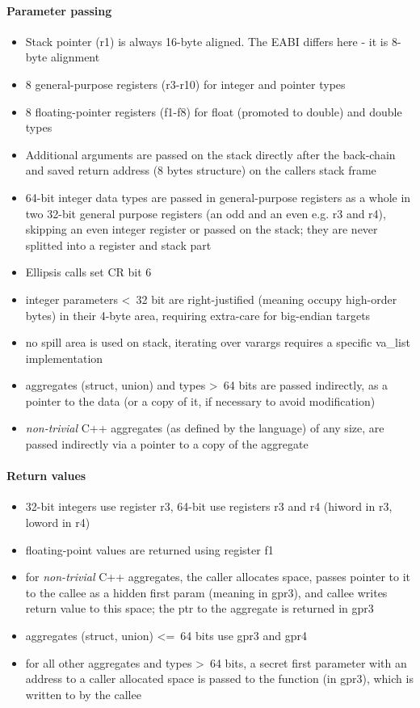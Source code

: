 \paragraph{Parameter passing}

\begin{itemize}
\item Stack pointer (r1) is always 16-byte aligned. The EABI differs here - it is 8-byte alignment
\item 8 general-purpose registers (r3-r10) for integer and pointer types
\item 8 floating-pointer registers (f1-f8) for float (promoted to double) and double types
\item Additional arguments are passed on the stack directly after the back-chain and saved return address (8 bytes structure) on the callers stack frame
\item 64-bit integer data types are passed in general-purpose registers as a whole in two
 32-bit general purpose registers (an odd and an even e.g. r3 and r4), skipping an even integer register
 or passed on the stack; they are never splitted into a register and stack part
\item Ellipsis calls set CR bit 6 
\item integer parameters \textless\ 32 bit are right-justified (meaning occupy high-order bytes) in their 4-byte area, requiring extra-care for big-endian targets
\item no spill area is used on stack, iterating over varargs requires a specific va\_list implementation
\item aggregates (struct, union) and types \textgreater\ 64 bits are passed indirectly, as a pointer to the data (or a copy of it, if necessary to avoid modification)
\item {\it non-trivial} C++ aggregates (as defined by the language) of any size, are passed indirectly via a pointer to a copy of the aggregate
\end{itemize}

\paragraph{Return values}

\begin{itemize}
\item 32-bit integers use register r3, 64-bit use registers r3 and r4 (hiword in r3, loword in r4)
\item floating-point values are returned using register f1
\item for {\it non-trivial} C++ aggregates, the caller allocates space, passes pointer to it to the callee as a hidden first param
(meaning in gpr3), and callee writes return value to this space; the ptr to the aggregate is returned in gpr3
\item aggregates (struct, union) \textless=\ 64 bits use gpr3 and gpr4
\item for all other aggregates and types \textgreater\ 64 bits, a secret first parameter with an address to a caller allocated space is passed to the function (in gpr3), which is written to by the callee
\end{itemize}


